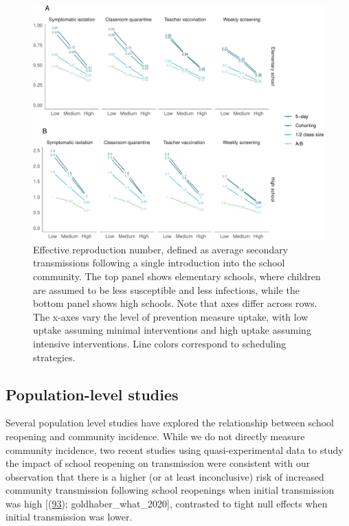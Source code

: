 \documentclass[
]{article}
\begin{document}
\begin{figure}
\centering
\includegraphics{Schools_draft_files/figure-latex/figr-1.pdf}
\caption{\label{figr} Effective reproduction number, defined as average
secondary transmissions following a single introduction into the school
community. The top panel shows elementary schools, where children are
assumed to be less susceptible and less infectious, while the bottom
panel shows high schools. Note that axes differ across rows. The x-axes
vary the level of prevention measure uptake, with low uptake assuming
minimal interventions and high uptake assuming intensive interventions.
Line colors correspond to scheduling strategies.}
\end{figure}

\hypertarget{population-level-studies}{%
\subsection{Population-level studies}\label{population-level-studies}}

Several population level studies have explored the relationship between
school reopening and community incidence. While we do not directly
measure community incidence, two recent studies using quasi-experimental
data to study the impact of school reopening on transmission were
consistent with our observation that there is a higher (or at least
inconclusive) risk of increased community transmission following school
reopenings when initial transmission was high
{[}(\protect\hyperlink{ref-harris_effects_nodate}{93});
goldhaber\_what\_2020{]}, contrasted to tight null effects when initial
transmission was lower.
\end{document}
